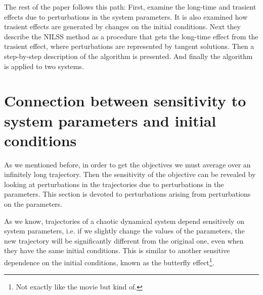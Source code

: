 \documentclass[10pt,twoside,a4paper]{article} %
\begin{document}
The rest of the paper follows this path: First, examine the long-time and trasient effects due to perturbations in the system parameters. It is also examined how trasient effects are generated by changes on the initial conditions. Next they describe the NILSS method as a procedure that gets the long-time effect from the trasient effect, where perturbations are represented by tangent solutions. Then a step-by-step description of the algorithm is presented. And finally the algorithm is applied to two systems.

\section{Connection between sensitivity to system parameters and initial conditions}

As we mentioned before, in order to get the objectives we must average over an infinitely long trajectory. Then the sensitivity of the objective can be revealed by looking at perturbations in the trajectories due to perturbations in the parameters. This section is devoted to perturbations arising from perturbations on the parameters.

As we know, trajectories of a chaotic dynamical system depend sensitively on system parameters, i.e. if we slightly change the values of the parameters, the new trajectory will be significantly different from the original one, even when they have the same initial conditions. This is similar to another sensitive dependence on the initial conditions, known as the butterfly effect\footnote{Not exactly like the movie but kind of.}.
\end{document}
